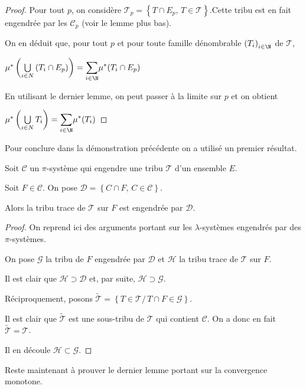 \begin{proof}
Pour tout $p$, on considère $\mathcal{T}_p = \left \{ T \cap E_p, \, T \in \mathcal{T}\right \}$.Cette tribu est en fait engendrée par les $\mathcal{C}_p$ (voir le lemme plus bas).

On en déduit que, pour tout $p$ et pour toute famille dénombrable $\left(T_i\right)_{i \in \N}$ de $\mathcal{T}$,

$
\mu^{*}\left(\bigcup \limits_{i \in N} \left(T_i \cap E_p\right)\right) = \displaystyle{\sum \limits_{i \in \N}} \mu^{*}(T_i \cap E_p)
$

En utilisant le dernier lemme, on peut passer à la limite sur $p$ et on obtient

$
\mu^{*}\left(\bigcup \limits_{i \in N} T_i\right) = \displaystyle{\sum \limits_{i \in \N}} \mu^{*}(T_i)
$
\end{proof}

Pour conclure dans la démonstration précédente on a utilisé un premier résultat.

\begin{lem}
Soit $\mathcal{C}$ un $\pi$-système qui engendre une tribu $\mathcal{T}$ d'un ensemble $E$.

Soit $F \in \mathcal{C}$. On pose $\mathcal{D} = \left \{ C \cap F, \, C \in \mathcal{C}\right \}$.

Alors la tribu trace de $\mathcal{T}$ sur $F$ est engendrée par $\mathcal{D}$.
\end{lem}


\begin{proof}
On reprend ici des arguments portant sur les $\lambda$-systèmes engendrés par des $\pi$-systèmes.

On pose $\mathcal{G}$ la tribu de $F$ engendrée par $\mathcal{D}$ et $\mathcal{H}$ la tribu trace de $\mathcal{T}$ sur $F$.

Il est clair que $\mathcal{H} \supset \mathcal{D}$ et, par suite,  $\mathcal{H} \supset \mathcal{G}$.

Réciproquement, posons $\tilde{\mathcal{T}} = \left \{ T \in \mathcal{T}/ \, T \cap F \in \mathcal{G}\right \}$.

Il est clair que $\tilde{\mathcal{T}}$ est une sous-tribu de $\mathcal{T}$ qui contient $\mathcal{C}$. On a donc en fait $\tilde{\mathcal{T}} = \mathcal{T}$.

Il en découle $\mathcal{H} \subset \mathcal{G}$.
\end{proof}

Reste maintenant à prouver le dernier lemme portant sur la convergence monotone.

